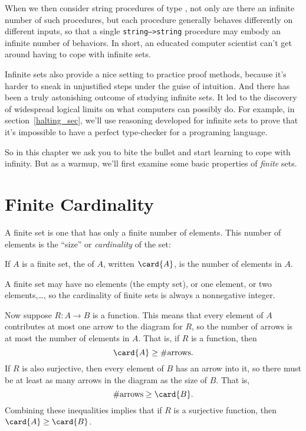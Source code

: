 When we then consider string procedures of
type , not only are there an infinite number
of such procedures, but each procedure generally behaves differently on
different inputs, so that a single \texttt{string-->string} procedure may
embody an infinite number of behaviors.  In short, an educated computer
scientist can't get around having to cope with infinite sets.
\fi

Infinite sets also provide a nice setting to practice proof methods,
because it's harder to sneak in unjustified steps under the guise of
intuition.  And there has been a truly astonishing outcome of studying
infinite sets.  It led to the discovery of widespread logical limits
on what computers can possibly do.  For example, in
section~\ref{halting_sec}, we'll use reasoning developed for infinite
sets to prove that it's impossible to have a perfect type-checker for
a programing language.

So in this chapter we ask you to bite the bullet and start learning to
cope with infinity.  But as a warmup, we'll first examine some basic
properties of \emph{finite} sets.

\section{Finite Cardinality}\label{mappingrule_sec}

A finite set is one that has only a finite number of elements.  This
number of elements is the ``size'' or \emph{cardinality} of the set:
\begin{definition}\label{fin_card_def}
If $A$ is a finite set, the  of $A$, written $\card{A}$,
is the number of elements in $A$.
\end{definition}
A finite set may have no elements (the empty set), or one element, or two
elements,\dots, so the cardinality of finite sets is always a nonnegative
integer.

Now suppose $R:A \to B$ is a function.  This means that every element
of $A$ contributes at most one arrow to the diagram for $R$, so the
number of arrows is at most the number of elements in $A$.  That is,
if $R$ is a function, then
\[
\card{A} \geq \#\text{arrows}.
\]
If $R$ is also surjective, then every element of $B$ has an arrow
into it, so there must be at least as many arrows in the diagram as the
size of $B$.  That is,
\[
\#\text{arrows} \geq \card{B}.
\]
Combining these inequalities implies that if $R$ is a surjective
function, then $\card{A} \geq \card{B}$.

